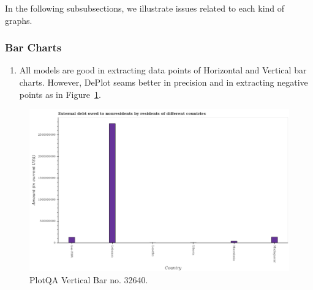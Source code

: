 \documentclass[
	letterpaper, %
]{jdf}
\begin{document}
       In the following subsubsections, we illustrate issues related to each kind of graphs.

\subsubsection{Bar Charts}\label{sssect:bar-errors}
\begin{enumerate}
    \item All models are good in extracting data points of Horizontal and Vertical bar charts.
        However, DePlot seams better in precision and in extracting negative points as in Figure~\ref{fig:plotqa-vbar-32640}.
       \end{enumerate}
       \begin{figure}
            \includegraphics{test-sample/plotqa/images/vertical-bar/32640.png}
            \caption{PlotQA Vertical Bar no. 32640.}
            \label{fig:plotqa-vbar-32640}
             \end{figure}
             
             
             
\end{document}
